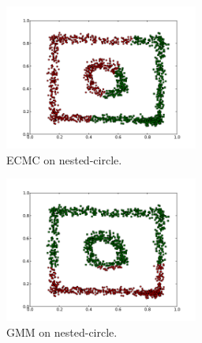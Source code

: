 \documentclass[conference]{IEEEtran}
\begin{document}
\begin{figure}[th]
\centering
\includegraphics[width=15pc]{ECMC_circle-weird.pdf}
\caption{ECMC on nested-circle.}
\label{ECMC_circleweird}
\end{figure}

\begin{figure}[th]
\centering
\includegraphics[width=15pc]{GMM_circle-weird.pdf}
\caption{GMM on nested-circle.}
\label{GMM_circleweird}
\end{figure}
\end{document}
